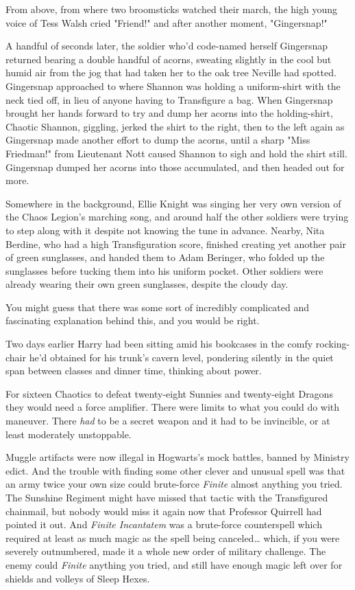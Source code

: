 From above, from where two broomsticks watched their march, the high young
voice of Tess Walsh cried "Friend!" and after another moment, "Gingersnap!"

A handful of seconds later, the soldier who'd code-named herself Gingersnap
returned bearing a double handful of acorns, sweating slightly in the cool but
humid air from the jog that had taken her to the oak tree Neville had spotted.
Gingersnap approached to where Shannon was holding a uniform-shirt with the
neck tied off, in lieu of anyone having to Transfigure a bag. When Gingersnap
brought her hands forward to try and dump her acorns into the holding-shirt,
Chaotic Shannon, giggling, jerked the shirt to the right, then to the left
again as Gingersnap made another effort to dump the acorns, until a sharp "Miss
Friedman!" from Lieutenant Nott caused Shannon to sigh and hold the shirt
still. Gingersnap dumped her acorns into those accumulated, and then headed out
for more.

Somewhere in the background, Ellie Knight was singing her very own version of
the Chaos Legion's marching song, and around half the other soldiers were
trying to step along with it despite not knowing the tune in advance. Nearby,
Nita Berdine, who had a high Transfiguration score, finished creating yet
another pair of green sunglasses, and handed them to Adam Beringer, who folded
up the sunglasses before tucking them into his uniform pocket. Other soldiers
were already wearing their own green sunglasses, despite the cloudy day.

You might guess that there was some sort of incredibly complicated and
fascinating explanation behind this, and you would be right.

Two days earlier Harry had been sitting amid his bookcases in the comfy
rocking-chair he'd obtained for his trunk's cavern level, pondering silently in
the quiet span between classes and dinner time, thinking about power.

For sixteen Chaotics to defeat twenty-eight Sunnies and twenty-eight Dragons
they would need a force amplifier. There were limits to what you could do with
maneuver. There \emph{had} to be a secret weapon and it had to be invincible,
or at least moderately unstoppable.

Muggle artifacts were now illegal in Hogwarts's mock battles, banned by
Ministry edict. And the trouble with finding some other clever and unusual
spell was that an army twice your own size could brute-force \emph{Finite}
almost anything you tried. The Sunshine Regiment might have missed that tactic
with the Transfigured chainmail, but nobody would miss it again now that
Professor Quirrell had pointed it out. And \emph{Finite Incantatem} was a
brute-force counterspell which required at least as much magic as the spell
being canceled{\ldots} which, if you were severely outnumbered, made it a whole
new order of military challenge. The enemy could \emph{Finite} anything you
tried, and still have enough magic left over for shields and volleys of Sleep
Hexes.

